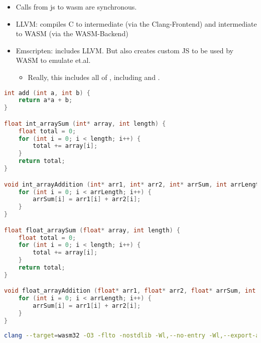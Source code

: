 \begin{itemize}
    \item Calls from js to wasm are synchronous.
\end{itemize}

\begin{itemize}
    \item LLVM: compiles C to intermediate (via the Clang-Frontend) and intermediate to WASM (via the WASM-Backend)
    \item Emscripten: includes LLVM. But also creates custom JS to be used by WASM to emulate  et.al.
    \begin{itemize} 
        \item Really, this includes all of , including  and .
    \end{itemize}
\end{itemize}


\begin{lstlisting}[language=c]
int add (int a, int b) {
    return a*a + b;
}

float int_arraySum (int* array, int length) {
    float total = 0; 
    for (int i = 0; i < length; i++) {
        total += array[i];
    }
    return total;
}

void int_arrayAddition (int* arr1, int* arr2, int* arrSum, int arrLength) {
    for (int i = 0; i < arrLength; i++) {
        arrSum[i] = arr1[i] + arr2[i];
    }
}

float float_arraySum (float* array, int length) {
    float total = 0; 
    for (int i = 0; i < length; i++) {
        total += array[i];
    }
    return total;
}

void float_arrayAddition (float* arr1, float* arr2, float* arrSum, int arrLength) {
    for (int i = 0; i < arrLength; i++) {
        arrSum[i] = arr1[i] + arr2[i];
    }
}
\end{lstlisting}

\begin{lstlisting}[language=bash]
    clang --target=wasm32 -O3 -flto -nostdlib -Wl,--no-entry -Wl,--export-all -Wl,--lto-O3 -o prog.wasm prog.c
\end{lstlisting}

